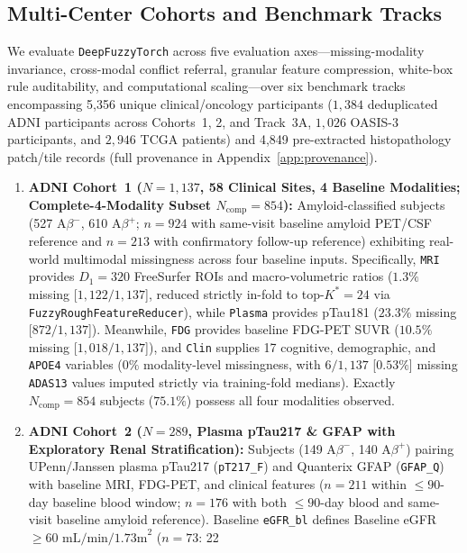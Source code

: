 \documentclass[10pt,twocolumn]{article}
\begin{document}
\subsection{Multi-Center Cohorts and Benchmark Tracks}
\label{sec:experiments}
\label{sec:cohorts}
We evaluate \texttt{DeepFuzzyTorch} across five evaluation axes---missing-modality invariance,
cross-modal conflict referral, granular feature compression, white-box rule auditability, and
computational scaling---over six benchmark tracks encompassing 5,356 unique clinical/oncology
participants ($1,384$ deduplicated ADNI participants across Cohorts~1, 2, and Track~3A, $1,026$
OASIS-3 participants, and $2,946$ TCGA patients) and 4,849 pre-extracted histopathology
patch/tile records (full provenance in Appendix~\ref{app:provenance}).
\begin{enumerate}[leftmargin=1.4em,itemsep=1pt,topsep=2pt]
    \item \textbf{ADNI Cohort~1 ($N=1,137$, 58 Clinical Sites, 4 Baseline Modalities;
    Complete-4-Modality Subset $N_{\text{comp}}=854$):}
    Amyloid-classified subjects (527 A$\beta^-$, 610 A$\beta^+$; $n=924$ with same-visit
    baseline amyloid PET/CSF reference and $n=213$ with confirmatory follow-up reference)
    exhibiting real-world multimodal missingness across four baseline inputs. Specifically,
    \texttt{MRI} provides $D_1 = 320$ FreeSurfer ROIs and macro-volumetric ratios ($1.3\%$
    missing [$1,122/1,137$], reduced strictly in-fold to top-$K^*=24$ via
    \texttt{FuzzyRoughFeatureReducer}), while \texttt{Plasma} provides pTau181 ($23.3\%$
    missing [$872/1,137$]). Meanwhile, \texttt{FDG} provides baseline FDG-PET SUVR ($10.5\%$
    missing [$1,018/1,137$]), and \texttt{Clin} supplies 17 cognitive, demographic, and
    \texttt{APOE4} variables ($0\%$ modality-level missingness, with $6/1,137$ [$0.53\%$]
    missing \texttt{ADAS13} values imputed strictly via training-fold medians). Exactly
    $N_{\text{comp}}=854$ subjects ($75.1\%$) possess all four modalities observed.
    \item \textbf{ADNI Cohort~2 ($N=289$, Plasma pTau217 \& GFAP with Exploratory Renal
    Stratification):} Subjects (149 A$\beta^-$, 140 A$\beta^+$) pairing UPenn/Janssen plasma
    pTau217 (\texttt{pT217\_F}) and Quanterix GFAP (\texttt{GFAP\_Q}) with baseline MRI,
    FDG-PET, and clinical features ($n=211$ within $\le 90$-day baseline blood window; $n=176$
    with both $\le 90$-day blood and same-visit baseline amyloid reference). Baseline
    \texttt{eGFR\_bl} defines Baseline eGFR $\ge 60\text{ mL/min/1.73m}^2$ ($n=73$: 22

\end{enumerate}
\end{document}

